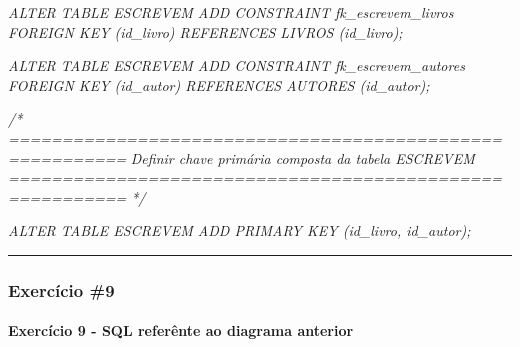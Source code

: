 \documentclass[
]{book}
\makeatletter
\newenvironment{Shaded}{\begin{snugshade}}{\end{snugshade}}
\newcommand{\CommentTok}[1]{\textcolor[rgb]{0.56,0.35,0.01}{\textit{#1}}}
\newcommand*\pandocbounded[1]{%
  \sbox\pandoc@box{#1}%
  \Gscale@div\@tempa{\textheight}{\dimexpr\ht\pandoc@box+\dp\pandoc@box\relax}%
  \Gscale@div\@tempb{\linewidth}{\wd\pandoc@box}%
  \ifdim\@tempb\p@<\@tempa\p@\let\@tempa\@tempb\fi%
  \ifdim\@tempa\p@<\p@\scalebox{\@tempa}{\usebox\pandoc@box}%
  \else\usebox{\pandoc@box}%
  \fi%
}
\makeatother
\begin{document}
\begin{Shaded}
\begin{Highlighting}[]
\CommentTok{ALTER TABLE ESCREVEM ADD CONSTRAINT fk\_escrevem\_livros   FOREIGN KEY (id\_livro) REFERENCES LIVROS (id\_livro);}

\CommentTok{ALTER TABLE ESCREVEM ADD CONSTRAINT fk\_escrevem\_autores  FOREIGN KEY (id\_autor) REFERENCES AUTORES (id\_autor);}

\CommentTok{/* =========================================================}
\CommentTok{   Definir chave primária composta da tabela ESCREVEM}
\CommentTok{   ========================================================= */}

\CommentTok{ALTER TABLE ESCREVEM  ADD PRIMARY KEY (id\_livro, id\_autor);}
\end{Highlighting}
\end{Shaded}

\begin{center}\rule{0.5\linewidth}{0.5pt}\end{center}

\subsubsection{Exercício \#9}\label{exercuxedcio-9-1}

\pandocbounded{}

\paragraph{Exercício 9 - SQL referênte ao diagrama anterior}\label{exercuxedcio-9---sql-referuxeante-ao-diagrama-anterior-1}
\end{document}
